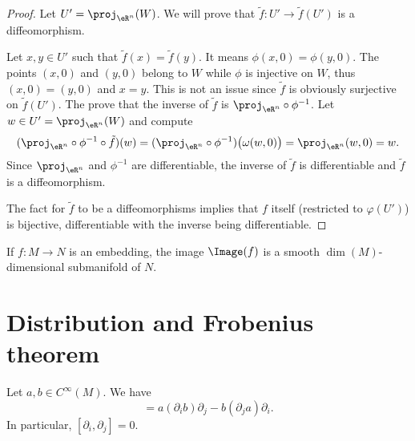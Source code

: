 \begin{proof}
	Let \( U'=\proj_{\eR^n}(W)\). We will prove that \( \tilde f\colon U'\to \tilde f(U')\) is a diffeomorphism.
	\begin{subproof}
		\spitem[Injective]
		Let \( x,y\in U'\) such that \( \tilde f(x)=\tilde f(y)\). It means \( \phi(x,0)=\phi(y,0)\). The points \( (x,0)\) and \( (y,0)\) belong to \( W\) while \( \phi\) is injective on \( W\), thus \( (x,0)=(y,0)\) and \( x=y\).
		\spitem[Surjective]
		This is not an issue since \( \tilde f\) is obviously surjective on \( \tilde f(U')\).
		The prove that the inverse of \( \tilde f\) is \( \proj_{\eR^n}\circ \phi^{-1}\). Let \( w\in U'=\proj_{\eR^n}(W)\) and compute
		\begin{equation}
			(\proj_{\eR^n}\circ \phi^{-1}\circ\tilde f)(w)=(\proj_{\eR^n}\circ\phi^{-1})\big( \omega(w,0) \big)=\proj_{\eR^n}(w,0)=w.
		\end{equation}
		\spitem[Diffeomorphism]
		Since \( \proj_{\eR^n}\) and \( \phi^{-1}\) are differentiable, the inverse of \( \tilde f\) is differentiable and \( \tilde f\) is a diffeomorphism.
	\end{subproof}
	The fact for \( \tilde f\) to be a diffeomorphisms implies that \( f\) itself (restricted to \( \varphi(U')\)) is bijective, differentiable with the inverse being differentiable.
\end{proof}

\begin{proposition}     \label{PROPooYHOKooYASzRL}
	If \( f\colon M\to N\) is an embedding, the image \( \Image(f)\) is a smooth \( \dim(M)\)-dimensional submanifold of \( N\).
\end{proposition}


\section{Distribution and Frobenius theorem}

\begin{lemma}       \label{LEMooQXRSooHDRequ}
	Let \( a,b\in  C^{\infty}(M)\). We have
	\begin{equation}
		[a\partial_i,b\partial_j]=a(\partial_ib)\partial_j-b(\partial_ja)\partial_i.
	\end{equation}
	In particular, \( [\partial_i,\partial_j]=0\).
\end{lemma}

